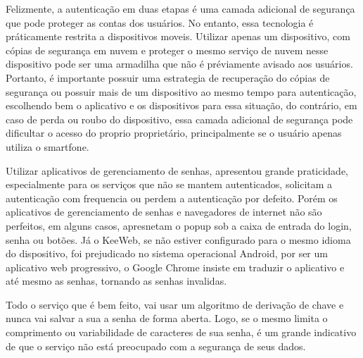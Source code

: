 \documentclass[12pt]{article}
\begin{document}
Felizmente, a autenticação em duas etapas é uma camada adicional de segurança que
pode proteger as contas dos usuários.
No entanto, essa tecnologia é práticamente restrita a dispositivos moveis.
Utilizar apenas um dispositivo, com cópias de segurança em nuvem e proteger o mesmo serviço de
nuvem nesse dispositivo pode ser uma armadilha que não é préviamente avisado aos
usuários.
Portanto, é importante possuir uma estrategia de recuperação do cópias de segurança ou possuir
mais de um dispositivo ao mesmo tempo para autenticação, escolhendo bem o
aplicativo e os dispositivos para essa situação, do contrário, em caso de perda
ou roubo do dispositivo, essa camada adicional de segurança pode dificultar o
acesso do proprio proprietário, principalmente se o usuário apenas utiliza o
smartfone.

Utilizar aplicativos de gerenciamento de senhas, apresentou grande praticidade,
especialmente para os serviços que não se mantem autenticados, solicitam a
autenticação com frequencia ou perdem a autenticação por defeito.
Porém os aplicativos de gerenciamento de senhas e navegadores de internet não
são perfeitos, em alguns casos, apresnetam o popup sob a caixa de entrada do
login, senha ou botões.
Já o KeeWeb, se não estiver configurado para o mesmo idioma do dispositivo, foi
prejudicado no sistema operacional Android, por ser um aplicativo web progressivo,
o Google Chrome insiste em traduzir o aplicativo e até mesmo as senhas, tornando
as senhas invalidas.

Todo o serviço que é bem feito, vai usar um algoritmo de derivação de chave e
nunca vai salvar a sua a senha de forma aberta.
Logo, se o mesmo limita o comprimento ou variabilidade de caracteres de sua senha,
é um grande indicativo de que o serviço não está preocupado com a segurança de
seus dados.



\end{document}
